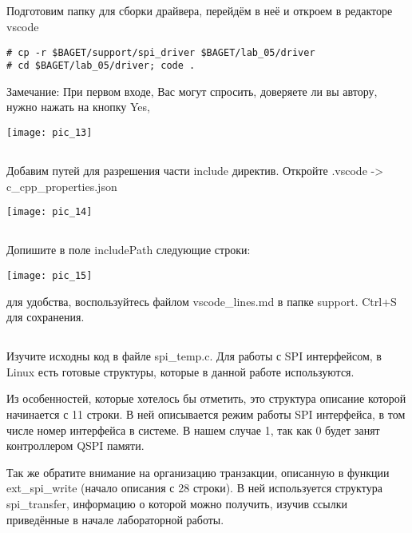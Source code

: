 \subsection{}Подготовим папку для сборки драйвера, перейдём в неё и откроем в редакторе vscode
\begin{lstlisting}[style=bash]
# cp -r $BAGET/support/spi_driver $BAGET/lab_05/driver 
# cd $BAGET/lab_05/driver; code .
\end{lstlisting}
\begin{Notes}{Замечание:}
	При первом входе, Вас могут спросить, доверяете ли вы автору, нужно нажать на кнопку Yes, 
	\begin{center}
		\texttt{[image: pic\_13]}
	\end{center}
\end{Notes}

\subsection{}Добавим путей для разрешения части include директив. Откройте .vscode -> c\_cpp\_properties.json
\begin{center}
	\texttt{[image: pic\_14]}
\end{center}

\subsection{}Допишите в поле includePath следующие строки:\\
\begin{center}
	\texttt{[image: pic\_15]}
\end{center}
для удобства, воспользуйтесь файлом vscode\_lines.md в папке support. Ctrl+S для сохранения.

\subsection{}Изучите исходны код в файле spi\_temp.c. Для работы с SPI интерфейсом, в Linux есть готовые структуры, которые в данной работе используются. 

Из особенностей, которые хотелось бы отметить, это структура описание которой начинается с 11 строки. В ней описывается режим работы SPI интерфейса, в том числе номер интерфейса в системе. В нашем случае 1, так как 0 будет занят контроллером QSPI памяти.

Так же обратите внимание на организацию транзакции, описанную в функции  ext\_spi\_write (начало описания с 28 строки). В ней используется структура spi\_transfer, информацию о которой можно получить, изучив ссылки приведённые в начале лабораторной работы.

